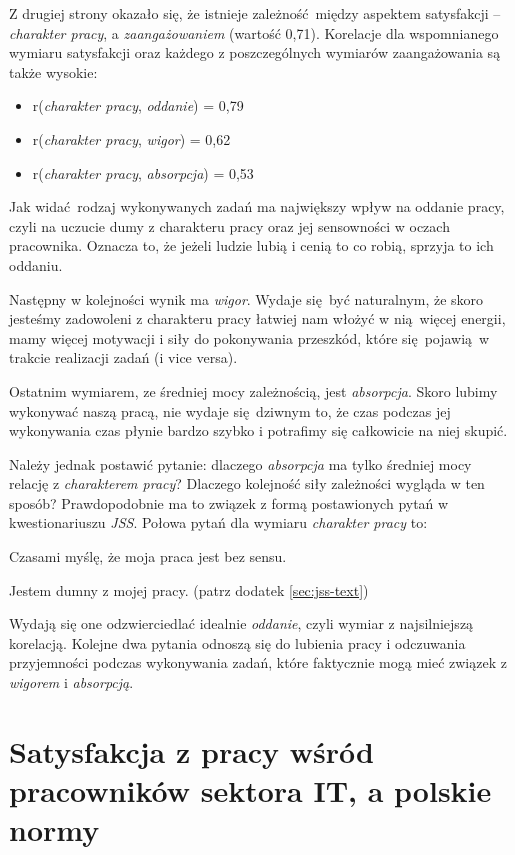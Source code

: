 Z drugiej strony okazało się, że istnieje zależność między aspektem satysfakcji -- \textit{charakter pracy}, a \textit{zaangażowaniem} (wartość 0,71). Korelacje dla wspomnianego wymiaru satysfakcji oraz każdego z poszczególnych wymiarów zaangażowania są także wysokie:
\begin{itemize}
  \item r(\textit{charakter pracy}, \textit{oddanie}) = 0,79
  \item r(\textit{charakter pracy}, \textit{wigor}) = 0,62
  \item r(\textit{charakter pracy}, \textit{absorpcja}) = 0,53
\end{itemize}
Jak widać rodzaj wykonywanych zadań ma największy wpływ na oddanie pracy, czyli na uczucie dumy z charakteru pracy oraz jej sensowności w oczach pracownika. Oznacza to, że jeżeli ludzie lubią i cenią to co robią, sprzyja to ich oddaniu. 

Następny w kolejności wynik ma \textit{wigor}. Wydaje się być naturalnym, że skoro jesteśmy zadowoleni z charakteru pracy łatwiej nam włożyć w nią więcej energii, mamy więcej motywacji i siły do pokonywania przeszkód, które się pojawią w trakcie
realizacji zadań (i vice versa). 

Ostatnim wymiarem, ze średniej mocy zależnością, jest \textit{absorpcja}. Skoro lubimy wykonywać naszą pracą, nie wydaje się dziwnym to, że czas podczas jej wykonywania czas płynie bardzo szybko i potrafimy się całkowicie na niej skupić. 

Należy jednak postawić pytanie: dlaczego \textit{absorpcja} ma tylko średniej mocy relację z \textit{charakterem pracy}? Dlaczego kolejność siły zależności wygląda w ten sposób? Prawdopodobnie ma to związek z formą postawionych pytań w kwestionariuszu \emph{JSS}. Połowa pytań dla wymiaru \textit{charakter pracy} to:
\begin{iquote}
  Czasami myślę, że moja praca jest bez sensu.
\end{iquote}
\begin{iquote}
  Jestem dumny z mojej pracy. (patrz dodatek \ref{sec:jss-text})
\end{iquote}
Wydają się one odzwierciedlać idealnie \textit{oddanie}, czyli wymiar z najsilniejszą korelacją. Kolejne dwa pytania odnoszą się do lubienia pracy i odczuwania przyjemności podczas wykonywania zadań, które faktycznie mogą mieć związek z \textit{wigorem} i \textit{absorpcją}.


\section{Satysfakcja z pracy wśród pracowników sektora IT, a polskie normy}
